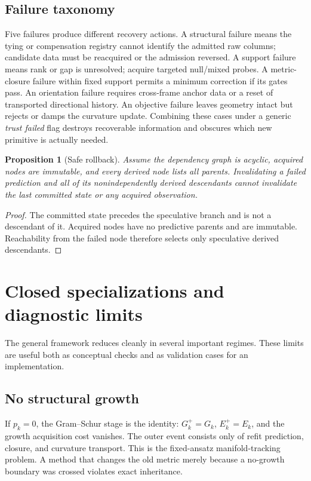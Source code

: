 \documentclass[10pt,twocolumn]{article}
\newtheorem{proposition}[theorem]{Proposition}
\theoremstyle{definition}
\theoremstyle{remark}
\begin{document}
\subsection{Failure taxonomy}

Five failures produce different recovery actions.  A structural failure means
the tying or compensation registry cannot identify the admitted raw columns;
candidate data must be reacquired or the admission reversed.  A support
failure means rank or gap is unresolved; acquire targeted null/mixed probes.
A metric-closure failure within fixed support permits a minimum correction if
its gates pass.  An orientation failure requires cross-frame anchor data or a
reset of transported directional history.  An objective failure leaves
geometry intact but rejects or damps the curvature update.  Combining these
cases under a generic \emph{trust failed} flag destroys recoverable information
and obscures which new primitive is actually needed.

\begin{proposition}[Safe rollback]
\label{prop:saferollback}
Assume the dependency graph is acyclic, acquired nodes are immutable, and
every derived node lists all parents.  Invalidating a failed prediction and
all of its nonindependently derived descendants cannot invalidate the last
committed state or any acquired observation.
\end{proposition}
\begin{proof}
The committed state precedes the speculative branch and is not a descendant
of it.  Acquired nodes have no predictive parents and are immutable.
Reachability from the failed node therefore selects only speculative derived
descendants.
\end{proof}

\section{Closed specializations and diagnostic limits}
\label{app:specializations}

The general framework reduces cleanly in several important regimes.  These
limits are useful both as conceptual checks and as validation cases for an
implementation.

\subsection{No structural growth}

If $p_k=0$, the Gram--Schur stage is the identity:
$G_k^+=G_k$, $E_k^+=E_k$, and the growth acquisition cost vanishes.  The outer
event consists only of refit prediction, closure, and curvature transport.
This is the fixed-ansatz manifold-tracking problem.  A method that changes the
old metric merely because a no-growth boundary was crossed violates exact
inheritance.
\end{document}
